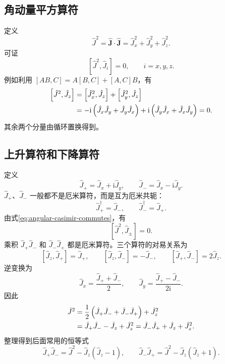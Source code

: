 \subsection{角动量平方算符}
定义
\begin{equation}
\boxed{\hat J^2=\hat{\bm J}\cdot\hat{\bm J}
=\hat J_x^2+\hat J_y^2+\hat J_z^2.}
\end{equation}
可证
\begin{equation}
\boxed{\left[\hat J^2,\hat J_i\right]=0,\qquad i=x,y,z.}
\label{eq:angular-casimir-commutes}
\end{equation}
例如利用 $\left[AB,C\right]=A\left[B,C\right]+\left[A,C\right]B$，有
\begin{align}
\left[\hat J^2,\hat J_z\right]
&=\left[\hat J_x^2,\hat J_z\right]+\left[\hat J_y^2,\hat J_z\right]\notag\\
&=-\mathrm{i}\left(\hat J_x\hat J_y+\hat J_y\hat J_x\right)
+\mathrm{i}\left(\hat J_y\hat J_x+\hat J_x\hat J_y\right)=0.
\end{align}
其余两个分量由循环置换得到。

\subsection{上升算符和下降算符}
定义
\begin{equation}
\boxed{\hat J_+=\hat J_x+\mathrm{i}\hat J_y,\qquad
\hat J_-=\hat J_x-\mathrm{i}\hat J_y.}
\end{equation}
$\hat J_+$、$\hat J_-$ 一般都不是厄米算符，而是互为厄米共轭：
\begin{equation}
\hat J_+^\dag=\hat J_-,\qquad\hat J_-^\dag=\hat J_+.
\end{equation}
由式\eqref{eq:angular-casimir-commutes}，有
\begin{equation}
\left[\hat J^2,\hat J_\pm\right]=0.
\end{equation}
乘积 $\hat J_+\hat J_-$ 和 $\hat J_-\hat J_+$ 都是厄米算符。三个算符的对易关系为
\begin{equation}
\boxed{\left[\hat J_z,\hat J_+\right]=\hat J_+,\qquad
\left[\hat J_z,\hat J_-\right]=-\hat J_-,\qquad
\left[\hat J_+,\hat J_-\right]=2\hat J_z.}
\label{eq:angular-ladder-commutators}
\end{equation}
逆变换为
\begin{equation}
\hat J_x=\frac{\hat J_++\hat J_-}{2},\qquad
\hat J_y=\frac{\hat J_+-\hat J_-}{2\mathrm{i}}.
\end{equation}
因此
\begin{align}
\hat J^2&=\frac12\left(\hat J_+\hat J_-+\hat J_-\hat J_+\right)+\hat J_z^2\notag\\
&=\hat J_+\hat J_--\hat J_z+\hat J_z^2
=\hat J_-\hat J_++\hat J_z+\hat J_z^2.
\end{align}
整理得到后面常用的恒等式
\begin{equation}
\boxed{\hat J_+\hat J_-=\hat J^2-\hat J_z\left(\hat J_z-1\right),\qquad
\hat J_-\hat J_+=\hat J^2-\hat J_z\left(\hat J_z+1\right).}
\label{eq:angular-ladder-products}
\end{equation}

